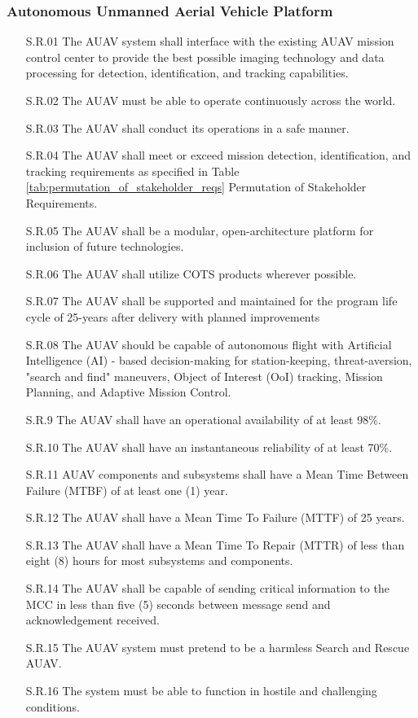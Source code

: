 \begin{fullwidth}
    \subsubsection*{Autonomous Unmanned Aerial Vehicle Platform}
    \begin{enumerate}
        \item[S.R.01]{The AUAV system shall interface with the existing AUAV mission control center to provide the best possible imaging technology and data processing for detection, identification, and tracking capabilities.}
        \item[S.R.02]{The AUAV must be able to operate continuously across the world.}
        \item[S.R.03]{The AUAV shall conduct its operations in a safe manner.}
        \item[S.R.04]{The AUAV shall meet or exceed mission detection, identification, and tracking requirements as specified in Table \ref{tab:permutation_of_stakeholder_reqs} Permutation of Stakeholder Requirements.}
        \item[S.R.05]{The AUAV shall be a modular, open-architecture platform for inclusion of future technologies.}
        \item[S.R.06]{The AUAV shall utilize COTS products wherever possible.}
        \item[S.R.07]{The AUAV shall be supported and maintained for the program life cycle of 25-years after delivery with planned improvements}
        \item[S.R.08]{The AUAV should be capable of autonomous flight with Artificial Intelligence (AI) - based decision-making for station-keeping, threat-aversion, "search and find" maneuvers, Object of Interest (OoI) tracking, Mission Planning, and Adaptive Mission Control.}
        \item[S.R.9]{The AUAV shall have an operational availability of at least 98\%.}
        \item[S.R.10]{The AUAV shall have an instantaneous reliability of at least 70\%.}
        \item[S.R.11]{AUAV components and subsystems shall have a Mean Time Between Failure (MTBF) of at least one (1) year.}
        \item[S.R.12]{The AUAV shall have a Mean Time To Failure (MTTF) of 25 years.}
        \item[S.R.13]{The AUAV shall have a Mean Time To Repair (MTTR) of less than eight (8) hours for most subsystems and components.}
        \item[S.R.14]{The AUAV shall be capable of sending critical information to the MCC in less than five (5) seconds between message send and acknowledgement received.}
        \item[S.R.15]{The AUAV system must pretend to be a harmless Search and Rescue AUAV.}
        \item[S.R.16]{The system must be able to function in hostile and challenging conditions.}
    \end{enumerate}
    

\end{fullwidth}
